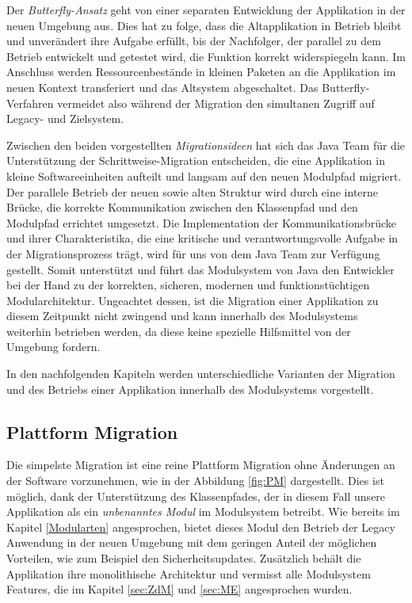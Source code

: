 	Der \textit{Butterfly-Ansatz} geht von einer separaten Entwicklung der Applikation in der neuen Umgebung aus. Dies hat zu folge, dass die Altapplikation in Betrieb bleibt und unverändert ihre Aufgabe erfüllt, bis der Nachfolger, der parallel zu dem Betrieb entwickelt und getestet wird, die Funktion korrekt widerspiegeln kann. Im Anschluss werden Ressourcenbestände in kleinen Paketen an die Applikation im neuen Kontext transferiert und das Altsystem abgeschaltet. Das Butterfly-Verfahren vermeidet also während der Migration den simultanen Zugriff auf Legacy- und Zielsystem. \cite{sneed2016softwaremigration} \bigbreak

	Zwischen den beiden vorgestellten \textit{Migrationsideen} hat sich das Java Team für die Unterstützung der Schrittweise-Migration entscheiden, die eine Applikation in kleine Softwareeinheiten aufteilt und langsam auf den neuen Modulpfad migriert. Der parallele Betrieb der neuen sowie alten Struktur wird durch eine interne Brücke, die korrekte Kommunikation zwischen den Klassenpfad und den Modulpfad errichtet umgesetzt. Die Implementation der Kommunikationsbrücke und ihrer Charakteristika, die eine kritische und verantwortungsvolle Aufgabe in der Migrationsprozess trägt, wird für uns von dem Java Team zur Verfügung gestellt. Somit unterstützt und führt das Modulsystem von Java den Entwickler bei der Hand zu der korrekten, sicheren, modernen und funktionstüchtigen Modularchitektur. \newline
	Ungeachtet dessen, ist die Migration einer Applikation zu diesem Zeitpunkt nicht zwingend und kann innerhalb des Modulsystems weiterhin betrieben werden, da diese keine spezielle Hilfsmittel von der Umgebung fordern.\bigbreak

	In den nachfolgenden Kapiteln werden unterschiedliche Varianten der Migration und des Betriebs einer Applikation innerhalb des Modulsystems vorgestellt. 


\subsection{Plattform Migration}
	Die simpelste Migration ist eine reine Plattform Migration ohne Änderungen an der Software vorzunehmen, wie in der Abbildung \ref{fig:PM} dargestellt. Dies ist möglich, dank der Unterstützung des Klassenpfades, der in diesem Fall unsere Applikation als ein \textit{unbenanntes Modul} im Modulsystem betreibt. Wie bereits im Kapitel \ref{Modularten} angesprochen, bietet dieses Modul den Betrieb der Legacy Anwendung in der neuen Umgebung mit dem geringen Anteil der möglichen Vorteilen, wie zum Beispiel den Sicherheitsupdates. Zusätzlich behält die Applikation ihre monolithische Architektur und vermisst alle Modulsystem Features, die im Kapitel \ref{sec:ZdM} und \ref{sec:ME} angesprochen wurden.

